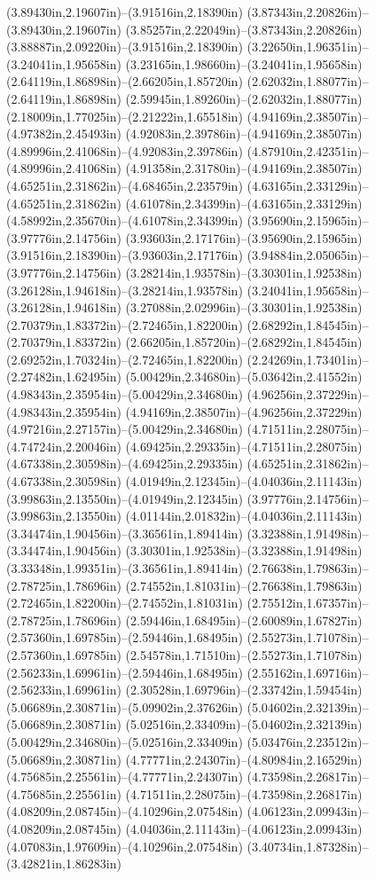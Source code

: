 (3.89430in,2.19607in)--(3.91516in,2.18390in) (3.87343in,2.20826in)--(3.89430in,2.19607in) (3.85257in,2.22049in)--(3.87343in,2.20826in) (3.88887in,2.09220in)--(3.91516in,2.18390in) (3.22650in,1.96351in)--(3.24041in,1.95658in) (3.23165in,1.98660in)--(3.24041in,1.95658in) (2.64119in,1.86898in)--(2.66205in,1.85720in) (2.62032in,1.88077in)--(2.64119in,1.86898in) (2.59945in,1.89260in)--(2.62032in,1.88077in) (2.18009in,1.77025in)--(2.21222in,1.65518in) (4.94169in,2.38507in)--(4.97382in,2.45493in) (4.92083in,2.39786in)--(4.94169in,2.38507in) (4.89996in,2.41068in)--(4.92083in,2.39786in) (4.87910in,2.42351in)--(4.89996in,2.41068in) (4.91358in,2.31780in)--(4.94169in,2.38507in) (4.65251in,2.31862in)--(4.68465in,2.23579in) (4.63165in,2.33129in)--(4.65251in,2.31862in) (4.61078in,2.34399in)--(4.63165in,2.33129in) (4.58992in,2.35670in)--(4.61078in,2.34399in) (3.95690in,2.15965in)--(3.97776in,2.14756in) (3.93603in,2.17176in)--(3.95690in,2.15965in) (3.91516in,2.18390in)--(3.93603in,2.17176in) (3.94884in,2.05065in)--(3.97776in,2.14756in) (3.28214in,1.93578in)--(3.30301in,1.92538in) (3.26128in,1.94618in)--(3.28214in,1.93578in) (3.24041in,1.95658in)--(3.26128in,1.94618in) (3.27088in,2.02996in)--(3.30301in,1.92538in) (2.70379in,1.83372in)--(2.72465in,1.82200in) (2.68292in,1.84545in)--(2.70379in,1.83372in) (2.66205in,1.85720in)--(2.68292in,1.84545in) (2.69252in,1.70324in)--(2.72465in,1.82200in) (2.24269in,1.73401in)--(2.27482in,1.62495in) (5.00429in,2.34680in)--(5.03642in,2.41552in) (4.98343in,2.35954in)--(5.00429in,2.34680in) (4.96256in,2.37229in)--(4.98343in,2.35954in) (4.94169in,2.38507in)--(4.96256in,2.37229in) (4.97216in,2.27157in)--(5.00429in,2.34680in) (4.71511in,2.28075in)--(4.74724in,2.20046in) (4.69425in,2.29335in)--(4.71511in,2.28075in) (4.67338in,2.30598in)--(4.69425in,2.29335in) (4.65251in,2.31862in)--(4.67338in,2.30598in) (4.01949in,2.12345in)--(4.04036in,2.11143in) (3.99863in,2.13550in)--(4.01949in,2.12345in) (3.97776in,2.14756in)--(3.99863in,2.13550in) (4.01144in,2.01832in)--(4.04036in,2.11143in) (3.34474in,1.90456in)--(3.36561in,1.89414in) (3.32388in,1.91498in)--(3.34474in,1.90456in) (3.30301in,1.92538in)--(3.32388in,1.91498in) (3.33348in,1.99351in)--(3.36561in,1.89414in) (2.76638in,1.79863in)--(2.78725in,1.78696in) (2.74552in,1.81031in)--(2.76638in,1.79863in) (2.72465in,1.82200in)--(2.74552in,1.81031in) (2.75512in,1.67357in)--(2.78725in,1.78696in) (2.59446in,1.68495in)--(2.60089in,1.67827in) (2.57360in,1.69785in)--(2.59446in,1.68495in) (2.55273in,1.71078in)--(2.57360in,1.69785in) (2.54578in,1.71510in)--(2.55273in,1.71078in) (2.56233in,1.69961in)--(2.59446in,1.68495in) (2.55162in,1.69716in)--(2.56233in,1.69961in) (2.30528in,1.69796in)--(2.33742in,1.59454in) (5.06689in,2.30871in)--(5.09902in,2.37626in) (5.04602in,2.32139in)--(5.06689in,2.30871in) (5.02516in,2.33409in)--(5.04602in,2.32139in) (5.00429in,2.34680in)--(5.02516in,2.33409in) (5.03476in,2.23512in)--(5.06689in,2.30871in) (4.77771in,2.24307in)--(4.80984in,2.16529in) (4.75685in,2.25561in)--(4.77771in,2.24307in) (4.73598in,2.26817in)--(4.75685in,2.25561in) (4.71511in,2.28075in)--(4.73598in,2.26817in) (4.08209in,2.08745in)--(4.10296in,2.07548in) (4.06123in,2.09943in)--(4.08209in,2.08745in) (4.04036in,2.11143in)--(4.06123in,2.09943in) (4.07083in,1.97609in)--(4.10296in,2.07548in) (3.40734in,1.87328in)--(3.42821in,1.86283in) 